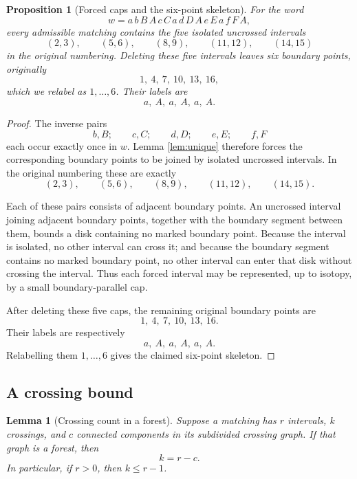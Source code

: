 \documentclass[12pt]{article}
\newtheorem{proposition}[theorem]{Proposition}
\newtheorem{lemma}[theorem]{Lemma}
\theoremstyle{definition}
\begin{document}
\begin{proposition}[Forced caps and the six-point skeleton]\label{prop:forcedcaps}
For the word
\[
w=a\,b\,B\,A\,c\,C\,a\,d\,D\,A\,e\,E\,a\,f\,F\,A,
\]
every admissible matching contains the five isolated uncrossed intervals
\[
(2,3),\qquad (5,6),\qquad (8,9),\qquad (11,12),\qquad (14,15)
\]
in the original numbering.  Deleting these five intervals leaves six boundary points, originally
\[
1,\ 4,\ 7,\ 10,\ 13,\ 16,
\]
which we relabel as \(1,\dots,6\).  Their labels are
\[
a,\ A,\ a,\ A,\ a,\ A.
\]
\end{proposition}

\begin{proof}
The inverse pairs
\[
b,B;\qquad c,C;\qquad d,D;\qquad e,E;\qquad f,F
\]
each occur exactly once in \(w\).  Lemma \ref{lem:unique} therefore forces the corresponding boundary points to be joined by isolated uncrossed intervals.  In the original numbering these are exactly
\[
(2,3),\qquad (5,6),\qquad (8,9),\qquad (11,12),\qquad (14,15).
\]

Each of these pairs consists of adjacent boundary points.  An uncrossed interval joining adjacent boundary points, together with the boundary segment between them, bounds a disk containing no marked boundary point.  Because the interval is isolated, no other interval can cross it; and because the boundary segment contains no marked boundary point, no other interval can enter that disk without crossing the interval.  Thus each forced interval may be represented, up to isotopy, by a small boundary-parallel cap.

After deleting these five caps, the remaining original boundary points are
\[
1,\ 4,\ 7,\ 10,\ 13,\ 16.
\]
Their labels are respectively
\[
a,\ A,\ a,\ A,\ a,\ A.
\]
Relabelling them \(1,\dots,6\) gives the claimed six-point skeleton.
\end{proof}

\subsection{A crossing bound}

\begin{lemma}[Crossing count in a forest]\label{lem:crosscount}
Suppose a matching has \(r\) intervals, \(k\) crossings, and \(c\) connected components in its subdivided crossing graph.  If that graph is a forest, then
\[
k=r-c.
\]
In particular, if \(r>0\), then \(k\le r-1\).
\end{lemma}
\end{document}
